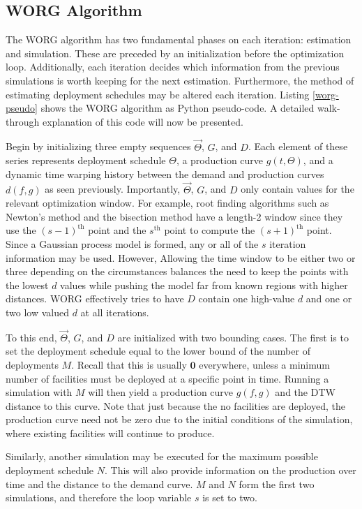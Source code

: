 \subsection{WORG Algorithm}
\label{algo}

The WORG algorithm has two fundamental phases on each iteration:
estimation and simulation.  These are preceded by an initialization 
before the optimization loop. Additionally, each iteration decides 
which information from the previous simulations is worth keeping for the
next estimation. Furthermore, the method of estimating deployment 
schedules may be altered each iteration.  Listing \ref{worg-pseudo}
shows the WORG algorithm as Python pseudo-code. A detailed walk-through 
explanation of this code will now be presented.

Begin by initializing three empty sequences $\vec{\Theta}$, $G$, and $D$.
Each element of these series represents deployment schedule $\Theta$, 
a production curve $g(t, \Theta)$, and a dynamic time warping history 
between the demand and production curves $d(f, g)$ as seen previously.
Importantly, $\vec{\Theta}$, $G$, and $D$ only contain values for
the relevant optimization window. For example, root finding algorithms
such as Newton's method and the bisection method have a length-2 window
since they use the $(s-1)^\mathrm{th}$ point and the $s^\mathrm{th}$ point
to compute the $(s+1)^\mathrm{th}$ point. Since a Gaussian process model is 
formed, any or all of the $s$ iteration information may be used. However, 
Allowing the time window to be either two or three depending on the 
circumstances balances the need to keep the points with the lowest $d$ 
values while pushing the model far from known regions with higher 
distances. WORG effectively tries to have $D$ contain one high-value $d$
and one or two low valued $d$ at all iterations. 

To this end, $\vec{\Theta}$, $G$, and $D$ are initialized with two 
bounding cases. The first is to set the deployment schedule equal to the
lower bound of the number of deployments $M$.  Recall that this is 
usually $\mathbf{0}$ everywhere, unless a minimum number of facilities 
must be deployed at a specific point in time. Running a simulation with 
$M$ will then yield a production curve $g(f, g)$ and the DTW distance to
this curve.  Note that just because the no facilities are deployed, the 
production curve need not be zero due to the initial conditions of the 
simulation, where existing facilities will continue to produce. 

Similarly, another simulation may be executed for the maximum possible
deployment schedule $N$. This will also provide information on the 
production over time and the distance to the demand curve. $M$ and $N$
form the first two simulations, and therefore the loop 
variable $s$ is set to two.

